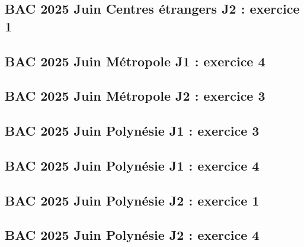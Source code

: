 \documentclass[lang=fr,edition=teacher,layout=sheet]{mxbook}
\begin{document}
\begingroup\endgroup
\par\bigskip
{}\subsection*{BAC 2025 Juin Centres étrangers J2 : exercice 1}
\begingroup\endgroup
\par\bigskip
{}\subsection*{BAC 2025 Juin Métropole J1 : exercice 4}
\begingroup\endgroup
\par\bigskip
{}\subsection*{BAC 2025 Juin Métropole J2 : exercice 3}
\begingroup\endgroup
\par\bigskip
{}\subsection*{BAC 2025 Juin Polynésie J1 : exercice 3}
\begingroup\endgroup
\par\bigskip
{}\subsection*{BAC 2025 Juin Polynésie J1 : exercice 4}
\begingroup\endgroup
\par\bigskip
{}\subsection*{BAC 2025 Juin Polynésie J2 : exercice 1}
\begingroup\endgroup
\par\bigskip
{}\subsection*{BAC 2025 Juin Polynésie J2 : exercice 4}
\end{document}
